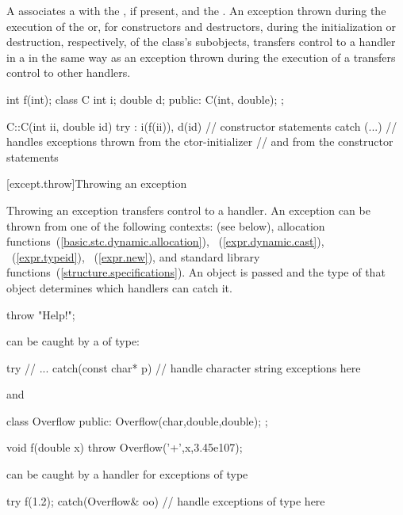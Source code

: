 \pnum
{}%
%
A
associates a
with the
,
if present, and the
.
An exception
thrown during the execution of the
or, for constructors and destructors, during the initialization or
destruction, respectively, of the class's subobjects,
transfers control to a handler in a
in the same way as an exception thrown during the execution of a
transfers control to other handlers.
\enterexample
\begin{codeblock}
int f(int);
class C {
  int i;
  double d;
public:
  C(int, double);
};

C::C(int ii, double id)
try : i(f(ii)), d(id) {
    // constructor statements
}
catch (...) {
    // handles exceptions thrown from the ctor-initializer
    // and from the constructor statements
}

\end{codeblock}
\exitexample


[except.throw]{Throwing an exception}%
%

\pnum
Throwing an exception transfers control to a handler.
\enternote
An exception can be thrown from one of the following contexts:
 (see below), allocation
functions~(\ref{basic.stc.dynamic.allocation}),
~(\ref{expr.dynamic.cast}),
~(\ref{expr.typeid}),
~(\ref{expr.new}), and standard library
functions~(\ref{structure.specifications}).
\exitnote
An object is passed and the type of that object determines which handlers
can catch it.
\enterexample
\begin{codeblock}
throw "Help!";
\end{codeblock}
can be caught by a
of
type:
\begin{codeblock}
try {
    // ...
}
catch(const char* p) {
    // handle character string exceptions here
}
\end{codeblock}
and
\begin{codeblock}
class Overflow {
public:
    Overflow(char,double,double);
};

void f(double x) {
    throw Overflow('+',x,3.45e107);
}
\end{codeblock}
can be caught by a handler for exceptions of type
\begin{codeblock}
try {
    f(1.2);
} catch(Overflow& oo) {
    // handle exceptions of type  here
}
\end{codeblock}
\exitexample

